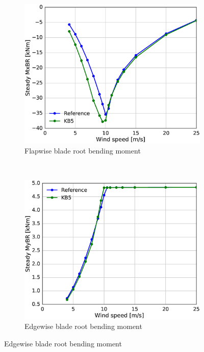 \begin{figure}[tph]
\begin{subfigure}{0.50\textwidth}
\includegraphics[width=\linewidth]{figures/KB6_final/KB5_MxBR_HS2.eps}
\caption{Flapwise blade root bending moment}
\label{subfig:KB5_Mx}
\end{subfigure}
 ~
\begin{subfigure}{0.50\textwidth}
\includegraphics[width=\linewidth]{figures/KB6_final/KB5_MyBR_HS2.eps}
\caption{Edgewise blade root bending moment}
\label{subfig:KB5_My}
\end{subfigure}


\end{figure}
